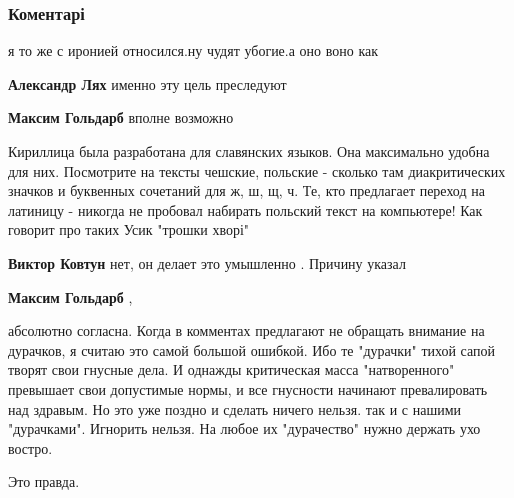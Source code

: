  
 
 
 
 
\subsubsection{Коментарі}
\label{sec:30_09_2021.fb.goldarb_maksim.1.latinica_alfavit.cmt}

\begin{itemize} %
я то же с иронией относился.ну чудят убогие.а оно воно как

\begin{itemize} %
\textbf{Александр Лях} именно эту цель преследуют

\textbf{Максим Гольдарб} вполне возможно
\end{itemize} %


Кириллица была разработана для славянских языков. Она максимально удобна для
них. Посмотрите на тексты чешские, польские - сколько там диакритических
значков и буквенных сочетаний для ж, ш, щ, ч. Те, кто предлагает переход на
латиницу - никогда не пробовал набирать польский текст на компьютере! Как
говорит про таких Усик "трошки хворі"

\begin{itemize} %
\textbf{Виктор Ковтун} нет, он делает это умышленно . Причину указал

\textbf{Максим Гольдарб} , 

абсолютно согласна. Когда в комментах предлагают не обращать внимание на
дурачков, я считаю это самой большой ошибкой. Ибо те "дурачки" тихой сапой
творят свои гнусные дела. И однажды критическая масса "натворенного" превышает
свои допустимые нормы, и все гнусности начинают превалировать над здравым. Но
это уже поздно и сделать ничего нельзя. так и с нашими "дурачками". Игнорить
нельзя. На любое их "дурачество" нужно держать ухо востро.

\end{itemize} %

Это правда.


\end{itemize}
